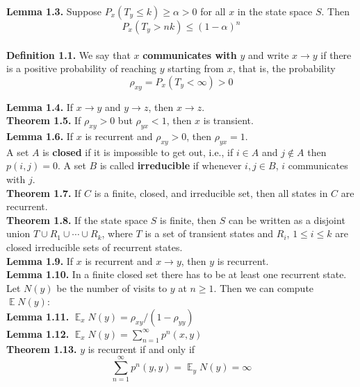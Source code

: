 \documentclass[12pt]{article}
\DeclareMathOperator*{\E}{\mathbb{E}}
\begin{document}
\textbf{Lemma 1.3.} Suppose $P_x(T_y \leq k) \geq \alpha > 0$ for all $x$ in the state space $S$. Then $$P_x(T_y > nk) \leq (1 - \alpha)^n$$\\

\textbf{Definition 1.1.} We say that $x$ \textbf{communicates with} $y$ and write $x \to y$ if there is a positive probability of reaching $y$ starting from $x$, that is, the probability $$\rho_{xy} = P_x(T_y < \infty) > 0$$

\textbf{Lemma 1.4.} If $x \to y$ and $y \to z$, then $x \to z$.\\

\textbf{Theorem 1.5.} If $\rho_{xy} > 0$ but $\rho_{yx} < 1$, then $x$ is transient.\\

\textbf{Lemma 1.6.} If $x$ is recurrent and $\rho_{xy} > 0$, then $\rho_{yx} = 1$.\\

A set $A$ is \textbf{closed} if it is impossible to get out, i.e., if $i \in A$ and $j \not\in A$ then $p(i, j) = 0$. A set $B$ is called \textbf{irreducible} if whenever $i, j \in B$, $i$ communicates with $j$.\\

\textbf{Theorem 1.7.} If $C$ is a finite, closed, and irreducible set, then all states in $C$ are recurrent.\\

\textbf{Theorem 1.8.} If the state space $S$ is finite, then $S$ can be written as a disjoint union $T \cup R_1 \cup \cdots \cup R_k$, where $T$ is a set of transient states and $R_i$, $1 \leq i \leq k$ are closed irreducible sets of recurrent states.\\

\textbf{Lemma 1.9.} If $x$ is recurrent and $x \to y$, then $y$ is recurrent.\\

\textbf{Lemma 1.10.} In a finite closed set there has to be at least one recurrent state.\\

Let $N(y)$ be the number of visits to $y$ at $n \geq 1$. Then we can compute $\E N(y)$:\\

\textbf{Lemma 1.11.} $\E_xN(y) = \rho_{xy}/(1 - \rho_{yy})$\\

\textbf{Lemma 1.12.} $\E_xN(y) = \sum_{n=1}^{\infty} p^n(x, y)$\\

\textbf{Theorem 1.13.} $y$ is recurrent if and only if $$\sum_{n=1}^{\infty} p^n(y, y) = \E_y N(y) = \infty$$
\end{document}
